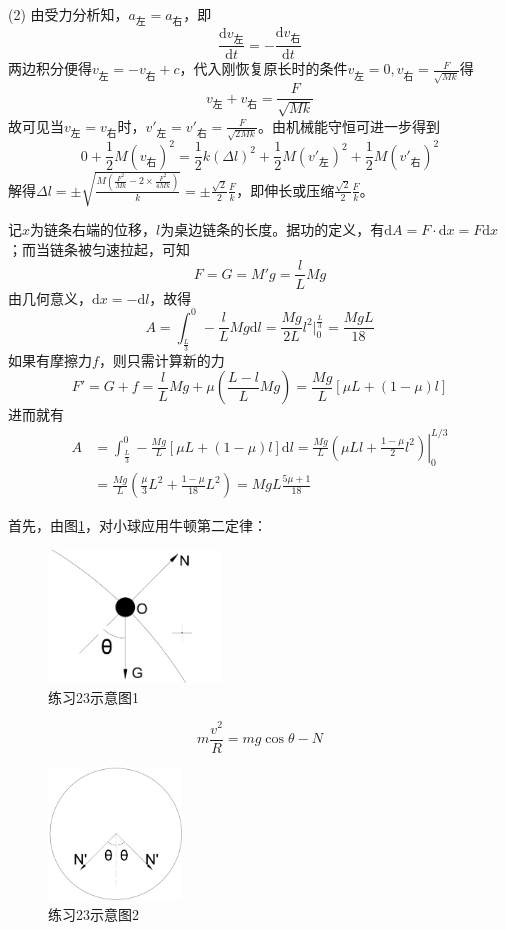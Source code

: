 \documentclass[b5paper,opensource,sourcefont,parskip]{qyxf-book}
\newcommand{\di}[1]{\mathrm{d}#1}
\newcommand{\dy}[2]{\frac{\di{#1}}{\di{#2}}}
\begin{document}
(2) 由受力分析知，$a_{\text{左}}=a_{\text{右}}$，即
\[\dy{v_{\text{左}}}{t}=-\dy{v_{\text{右}}}{t}\]
两边积分便得$v_{\text{左}}=-v_{\text{右}}+c$，代入刚恢复原长时的条件$v_{\text{左}}=0,v_{\text{右}}=\frac{F}{\sqrt{Mk}}$得
\[v_{\text{左}}+v_{\text{右}}=\frac{F}{\sqrt{Mk}}\]
故可见当$v_{\text{左}}=v_{\text{右}}$时，$v'_{\text{左}}=v'_{\text{右}}=\frac{F}{\sqrt{2Mk}}$。由机械能守恒可进一步得到
\[0+\frac{1}{2}M(v_{\text{右}})^2=\frac{1}{2}k(\Delta l)^2+\frac{1}{2}M(v'_{\text{左}})^2+\frac{1}{2}M(v'_{\text{右}})^2\]
解得$\Delta l=\pm\sqrt{\frac{M\left(\frac{F^2}{Mk}-2\times\frac{F^2}{4Mk}\right)}{k}}=\pm\frac{\sqrt{2}}{2}\frac{F}{k}$，即伸长或压缩$\frac{\sqrt{2}}{2}\frac{F}{k}$。


\solve 记$x$为链条右端的位移，$l$为桌边链条的长度。据功的定义，有$\di{A}=F\cdot\di{x}=F\di{x}$；而当链条被匀速拉起，可知
\[F=G=M'g=\frac{l}{L}Mg\]
由几何意义，$\di{x}=-\di{l}$，故得
\[
A=\int_{\frac{L}{3}}^{0} -\frac{l}{L}Mg\di{l}
=\frac{Mg}{2L}l^2\left.\right|_{0}^{\frac{L}{3}}
=\frac{MgL}{18}
\]
如果有摩擦力$f$，则只需计算新的力
\[
F'=G+f=\frac{l}{L}Mg+\mu\left(\frac{L-l}{L}Mg\right)=\frac{Mg}{L}[\mu L+(1-\mu)l]
\]
进而就有
\begin{align*}
A&=\int_{\frac{L}{3}}^{0} -\frac{Mg}{L}[\mu L+(1-\mu)l] \di{l}=\frac{Mg}{L}\left.\left(\mu Ll+\frac{1-\mu}{2}l^2\right)\right|_{0}^{L/3}\\
&=\frac{Mg}{L}\left(\frac{\mu}{3}L^2+\frac{1-\mu}{18}L^2\right)=MgL\frac{5\mu +1}{18}
\end{align*}


\solve 首先，由图\ref{fig:t23-1}，对小球应用牛顿第二定律：

\begin{figure}[htbp]
\centering
\includegraphics[height=100pt]{Chp2_illus2.png}
\caption{练习23示意图1}\label{fig:t23-1}
\end{figure}

\[m\dfrac{v^2}{R}=mg\cos\theta-N\]

\begin{figure}[htbp]
\centering
\includegraphics[height=100pt]{Chp2_illus3.png}
\caption{练习23示意图2}\label{fig:t23-2}
\end{figure}
\end{document}
